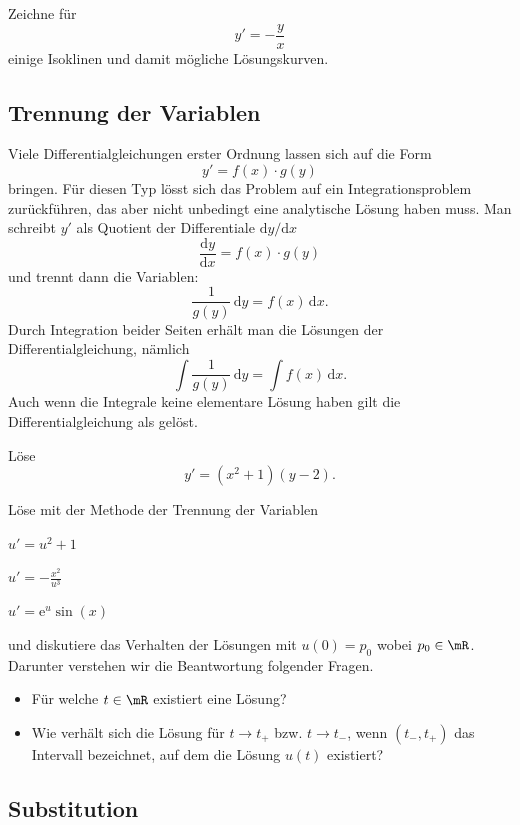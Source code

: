 \documentclass[%
11pt,%
twoside,%
titlepage,%
german,%
headsepline%
]{scrartcl}
\begin{document}
\begin{ueb}
Zeichne f\"ur
$$y'=-\frac{y}{x}$$
einige Isoklinen und damit m\"ogliche L\"osungskurven.
\end{ueb}

\subsection{Trennung der Variablen}

Viele Differentialgleichungen erster Ordnung lassen sich auf die Form
$$y'=f(x)\cdot g(y)$$
bringen.
F\"ur diesen Typ l\"osst sich das Problem auf ein Integrationsproblem zur\"uckf\"uhren, das aber nicht unbedingt eine analytische L\"osung haben muss.
Man schreibt $y'$ als Quotient der Differentiale $\mathrm{d}y/\mathrm{d}x$
$$\frac{\mathrm{d}y}{\mathrm{d}x}=f(x)\cdot g(y)$$
und trennt dann die Variablen:
$$\frac{1}{g(y)}\,\mathrm{d}y=f(x)\,\mathrm{d}x.$$
Durch Integration beider Seiten erh\"alt man die L\"osungen der Differentialgleichung, n\"amlich
$$\int\frac{1}{g(y)}\,\mathrm{d}y=\int f(x)\,\mathrm{d}x.$$
Auch wenn die Integrale keine elementare L\"osung haben gilt die Differentialgleichung als gel\"ost.

\begin{ueb}
L\"ose
$$y'=(x^2+1)(y-2).$$
\end{ueb}

\begin{ueb}
L\"ose mit der Methode der Trennung der Variablen
\begin{enumeratea}
\item $u'=u^2+1$
\item $u'=-\frac{x^2}{u^3}$
\item $u'=\mathrm{e}^u\sin(x)$
\end{enumeratea}
und diskutiere das Verhalten der L\"osungen mit $u(0)=p_0$ wobei $p_0\in\mR$. Darunter verstehen wir die Beantwortung folgender Fragen.
\begin{itemize}
\item F\"ur welche $t\in\mR$ existiert eine L\"osung?
\item Wie verh\"alt sich die L\"osung f\"ur $t\to t_+$ bzw. $t\to t_-$, wenn $(t_-,t_+)$ das Intervall bezeichnet, auf dem die L\"osung $u(t)$ existiert?
\end{itemize}
\end{ueb}

\subsection{Substitution}
\end{document}
